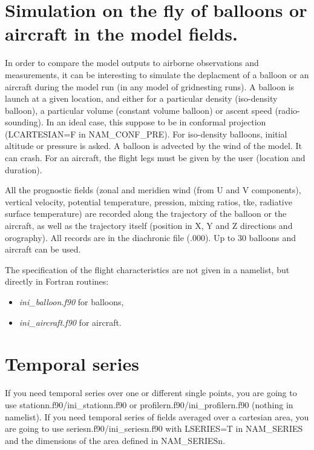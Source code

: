 

\section{Simulation on the fly of balloons or aircraft in the model fields.}
\label{ss:balloon}

In order to compare the model outputs to airborne observations
and measurements, it can be interesting to simulate the deplacment of a
balloon or an aircraft during the model run (in any model of
gridnesting runs). A balloon is launch at
a given location, and either for a particular density (iso-density balloon),
a particular volume (constant volume balloon)
or ascent speed (radio-sounding). In an ideal case, this suppose to be in conformal projection 
(LCARTESIAN=F in NAM\_CONF\_PRE).
For iso-density balloons, initial 
altitude or pressure is asked. A balloon is advected by the wind of the
model. It can crash. For an aircraft, the flight
legs must be given by the user (location and duration). 

All the prognostic fields (zonal and meridien wind
(from U and V components), vertical velocity, potential temperature, pression,
mixing ratios, tke, radiative surface temperature)
are recorded along the trajectory
of the balloon or the aircraft, as well as the trajectory itself (position in
X, Y and Z directions and orography).
All records are in the diachronic file (.000). Up to 30 balloons and aircraft
can be used.

The specification of the flight characteristics  are not given in a namelist,
but directly in Fortran routines:
\begin{itemize}
\item  {\it ini\_balloon.f90} for balloons,
\item  {\it ini\_aircraft.f90} for aircraft.
\end{itemize}

\section{Temporal series}
If you need temporal series over one or different single points, you are going to use stationn.f90/ini\_stationn.f90 or profilern.f90/ini\_profilern.f90 (nothing in namelist). If you need temporal series of fields averaged over a cartesian area, you are going to use seriesn.f90/ini\_seriesn.f90 with LSERIES=T in NAM\_SERIES and the dimensions of the area defined in NAM\_SERIESn.

